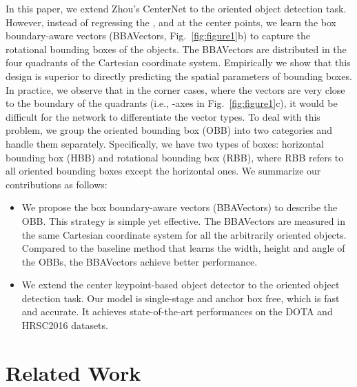 \documentclass[10pt,twocolumn,letterpaper]{article}
\begin{document}
In this paper, we extend Zhou's CenterNet to the oriented object detection task. However, instead of regressing the ,  and  at the center points, we learn the box boundary-aware vectors (BBAVectors, Fig.~\ref{fig:figure1}b) to capture the rotational bounding boxes of the objects. The BBAVectors are distributed in the four quadrants of the Cartesian coordinate system.
Empirically we show that this design is superior to directly predicting the spatial parameters of bounding boxes.
In practice, we observe that in the corner cases, where the vectors are very close to the boundary of the quadrants (i.e., -axes in Fig.~\ref{fig:figure1}c), it would be difficult for the network to differentiate the vector types. To deal with this problem, we group the oriented bounding box (OBB) into two categories and handle them separately. Specifically, we have two types of boxes: horizontal bounding box (HBB) and rotational bounding box (RBB), where RBB refers to all oriented bounding boxes except the horizontal ones. We summarize our contributions as follows:
\begin{itemize}
    \item We propose the box boundary-aware vectors (BBAVectors) to describe the OBB. This strategy is simple yet effective. The BBAVectors are measured in the same Cartesian coordinate system for all the arbitrarily oriented objects. Compared to the baseline method that learns the width, height and angle of the OBBs, the BBAVectors achieve better performance.
    
    \item We extend the center keypoint-based object detector to the oriented object detection task. Our model is single-stage and anchor box free, which is fast and accurate. It achieves state-of-the-art performances on the DOTA and HRSC2016 datasets.
    
\end{itemize}


\section{Related Work}
\label{Related Work}
\end{document}
